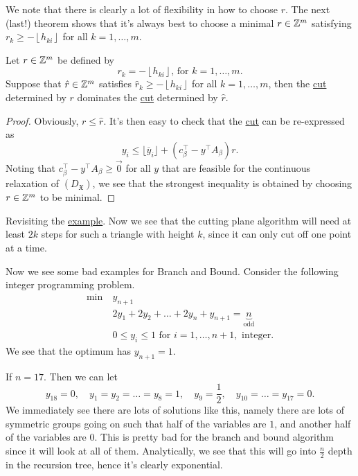 We note that there is clearly a lot of flexibility in how to choose \(r\). The next (last!) theorem shows
that it's always best to choose a minimal \(r\in \mathbb{\MakeUppercase{z}} ^m\)  satisfying \(r_k \geq -\left\lfloor h_{ki} \right\rfloor\) for all \(k = 1, \ldots  , m\).

\begin{theorem}\label{thm:lec24-3}
	Let \(r\in \mathbb{\MakeUppercase{z}} ^m\) be defined by
	\[
		r_k = -\left\lfloor h_{ki} \right\rfloor\text{, for }k = 1, \ldots , m.
	\]
	Suppose that \(\hat{r} \in \mathbb{\MakeUppercase{z}} ^m\) satisfies \(\hat{r}_k \geq -\left\lfloor h_{ki} \right\rfloor\) for all \(k = 1, \ldots , m\), then
	the \hyperref[def:Chvatal-Gomory-cut]{cut} determined by \(r\) dominates the \hyperref[def:Chvatal-Gomory-cut]{cut} determined by \(\hat{r} \).
\end{theorem}
\begin{proof}
	Obviously, \(r \leq \hat{r} \). It's then easy to check that the \hyperref[def:Chvatal-Gomory-cut]{cut} can be re-expressed as
	\[
		y_{i} \leq \lfloor \overline{y} _{i} \rfloor + (c^{\top} _\beta - y^{\top} A_\beta )r.
	\]
	Noting that \(c^{\top} _\beta - y^{\top} A_\beta \geq \vec{0} \) for all \(y\) that are feasible for the continuous relaxation of \((D_{\mathfrak{X}})\),
	we see that the strongest inequality is obtained by choosing \(r\in\mathbb{\MakeUppercase{z}} ^m\) to be minimal.
\end{proof}

Revisiting the \hyperref[eg:branch-and-bound]{example}. Now we see that the cutting plane algorithm will need at least \(2k\) steps
for such a triangle with height \(k\), since it can only cut off one point at a time.

\begin{eg}
	Now we see some bad examples for Branch and Bound. Consider the following integer programming problem.
	\[
		\begin{aligned}
			\min~ & y_{n+1}                                                              \\
			      & 2y_{1} + 2y_2 + \ldots +2y_n + y_{n+1} = \underbrace{n}_{\text{odd}} \\
			      & 0\leq y_{i}\leq 1 \text{ for }i = 1, \ldots , n+1, \text{ integer}.
		\end{aligned}
	\]
	We see that the optimum has \(y_{n+1} = 1\).

	If \(n = 17\). Then we can let
	\[
		y_{18} = 0,\quad y_1 = y_2 = \ldots = y_8 = 1,\quad y_9 = \frac{1}{2},\quad y_{10} = \ldots = y_{17} = 0.
	\]
	We immediately see there are lots of solutions like this, namely there are lots of symmetric groups going on such that
	half of the variables are \(1\), and another half of the variables are \(0\). This is pretty bad
	for the branch and bound algorithm since it will look at all of them. Analytically, we see that this will go into \(\frac{n}{2}\)
	depth in the recursion tree, hence it's clearly exponential.
\end{eg}

